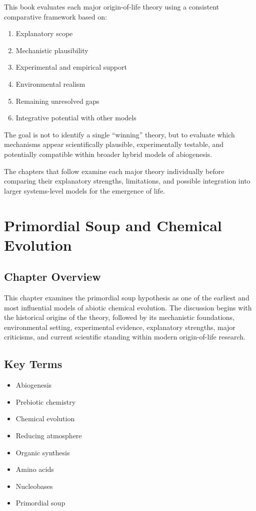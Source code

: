 \documentclass[
  oneside]{book}
\providecommand{\tightlist}{%
  \setlength{\itemsep}{0pt}\setlength{\parskip}{0pt}}
\begin{document}
This book evaluates each major origin-of-life theory using a consistent comparative framework based on:

\begin{enumerate}
\def\labelenumi{\arabic{enumi}.}
\tightlist
\item
  Explanatory scope
\item
  Mechanistic plausibility
\item
  Experimental and empirical support
\item
  Environmental realism
\item
  Remaining unresolved gaps
\item
  Integrative potential with other models
\end{enumerate}

The goal is not to identify a single ``winning'' theory, but to evaluate which mechanisms appear scientifically plausible, experimentally testable, and potentially compatible within broader hybrid models of abiogenesis.

The chapters that follow examine each major theory individually before comparing their explanatory strengths, limitations, and possible integration into larger systems-level models for the emergence of life.

\chapter{Primordial Soup and Chemical Evolution}\label{primordial-soup-and-chemical-evolution}

\section{Chapter Overview}\label{chapter-overview}

This chapter examines the primordial soup hypothesis as one of the earliest and most influential models of abiotic chemical evolution. The discussion begins with the historical origins of the theory, followed by its mechanistic foundations, environmental setting, experimental evidence, explanatory strengths, major criticisms, and current scientific standing within modern origin-of-life research.

\section{Key Terms}\label{key-terms}

\begin{itemize}
\tightlist
\item
  Abiogenesis
\item
  Prebiotic chemistry
\item
  Chemical evolution
\item
  Reducing atmosphere
\item
  Organic synthesis
\item
  Amino acids
\item
  Nucleobases
\item
  Primordial soup
\end{itemize}
\end{document}
